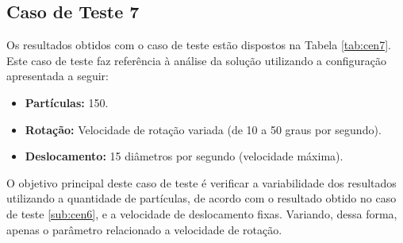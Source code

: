 \subsection{Caso de Teste 7}
\label{sub:cen7}

Os resultados obtidos com o caso de teste estão dispostos na Tabela \ref{tab:cen7}. Este caso de teste faz referência à análise da solução
utilizando a configuração apresentada a seguir:

\begin{itemize}
  \item \textbf{Partículas:} 150.
  \item \textbf{Rotação:} Velocidade de rotação variada (de 10 a 50 graus por segundo).
  \item \textbf{Deslocamento:} 15 diâmetros por segundo (velocidade máxima).
\end{itemize}

O objetivo principal deste caso de teste é verificar a variabilidade dos resultados utilizando a quantidade de partículas, de
acordo com o resultado obtido no caso de teste \ref{sub:cen6}, e a velocidade de deslocamento fixas. Variando, dessa forma, apenas
o parâmetro relacionado a velocidade de rotação.

